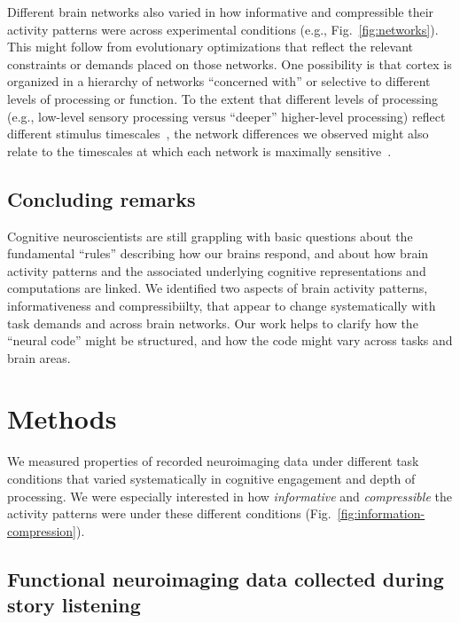 \documentclass[english, 11pt]{article}
\begin{document}
Different brain networks also varied in how informative and compressible their
activity patterns were across experimental conditions (e.g.,
Fig.~\ref{fig:networks}). This might follow from evolutionary optimizations
that reflect the relevant constraints or demands placed on those networks. One
possibility is that cortex is organized in a hierarchy of networks ``concerned
with'' or selective to different levels of processing or function. To the
extent that different levels of processing (e.g., low-level sensory processing
versus ``deeper'' higher-level processing) reflect different stimulus
timescales~\citep[e.g.,][]{Mann20}, the network differences we observed might
also relate to the timescales at which each network is maximally
sensitive~\citep{RegeEtal18, BaldEtal17,LernEtal11, HassEtal08}.

\subsection*{Concluding remarks}

Cognitive neuroscientists are still grappling with basic questions about the
fundamental ``rules'' describing how our brains respond, and about how brain
activity patterns and the associated underlying cognitive representations and
computations are linked. We identified two aspects of brain activity patterns,
informativeness and compressibiilty, that appear to change systematically with
task demands and across brain networks. Our work helps to clarify how the
``neural code'' might be structured, and how the code might vary across tasks
and brain areas.

\section*{Methods}

We measured properties of recorded neuroimaging data under different task
conditions that varied systematically in cognitive engagement and depth of
processing. We were especially interested in how \textit{informative} and
\textit{compressible} the activity patterns were under these different
conditions (Fig.~\ref{fig:information-compression}).


\subsection*{Functional neuroimaging data collected during story
  listening}
\end{document}
